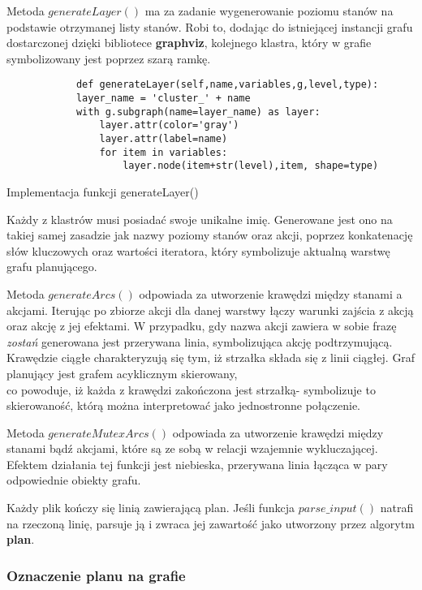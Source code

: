     Metoda $generateLayer()$ ma za zadanie wygenerowanie poziomu stanów na podstawie otrzymanej listy stanów. Robi to, dodając do istniejącej instancji 
    grafu dostarczonej dzięki bibliotece \textbf{graphviz}, kolejnego klastra, który w grafie symbolizowany jest poprzez szarą ramkę.
    \begin{listing}[H]
        \begin{verbatim}
            def generateLayer(self,name,variables,g,level,type):
            layer_name = 'cluster_' + name
            with g.subgraph(name=layer_name) as layer:
                layer.attr(color='gray')
                layer.attr(label=name)
                for item in variables:
                    layer.node(item+str(level),item, shape=type)
        \end{verbatim}
    \caption{Implementacja funkcji generateLayer()}
    \end{listing}
    Każdy z klastrów musi posiadać swoje unikalne imię. Generowane jest ono na takiej samej zasadzie jak nazwy poziomy stanów oraz akcji, poprzez 
    konkatenację słów kluczowych oraz wartości iteratora, który symbolizuje aktualną warstwę grafu planującego. 

    Metoda $generateArcs()$ odpowiada za utworzenie krawędzi między stanami a akcjami. Iterując po zbiorze akcji dla danej warstwy łączy warunki 
    zajścia z akcją oraz akcję z jej efektami. W przypadku, gdy nazwa akcji zawiera w sobie frazę \textit{zostań} generowana jest przerywana linia, 
    symbolizująca akcję podtrzymującą. Krawędzie ciągłe charakteryzują się tym, iż strzałka składa się z linii ciągłej. Graf planujący jest 
    grafem acyklicznym skierowany, \\
    co powoduje, iż każda z krawędzi zakończona jest strzałką- symbolizuje to skierowaność, którą można
    interpretować jako jednostronne połączenie.

    Metoda $generateMutexArcs()$ odpowiada za utworzenie krawędzi między stanami bądź akcjami, które są ze sobą w relacji wzajemnie wykluczającej. 
    Efektem działania tej funkcji jest niebieska, przerywana linia łącząca w pary odpowiednie obiekty grafu.

    Każdy plik kończy się linią zawierającą plan. Jeśli funkcja $parse\_input()$ natrafi na rzeczoną linię, parsuje ją i zwraca jej zawartość 
    jako utworzony przez algorytm \textbf{plan}.

    \subsubsection{Oznaczenie planu na grafie}

